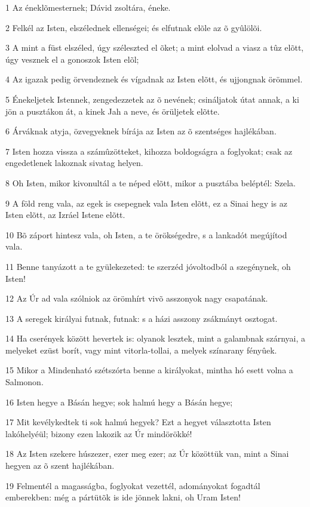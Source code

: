 \par 1 Az éneklõmesternek; Dávid zsoltára, éneke.
\par 2 Felkél az Isten, elszélednek ellenségei; és elfutnak elõle az õ gyûlölõi.
\par 3 A mint a füst elszéled, úgy széleszted el õket; a mint elolvad a viasz a tûz elõtt, úgy vesznek el a gonoszok Isten elõl;
\par 4 Az igazak pedig örvendeznek és vígadnak az Isten elõtt, és ujjongnak örömmel.
\par 5 Énekeljetek Istennek, zengedezzetek az õ nevének; csináljatok útat annak, a ki jön a pusztákon át, a kinek Jah a neve, és örüljetek elõtte.
\par 6 Árváknak atyja, özvegyeknek bírája az Isten az õ szentséges hajlékában.
\par 7 Isten hozza vissza a számûzötteket, kihozza boldogságra a foglyokat; csak az engedetlenek lakoznak sivatag helyen.
\par 8 Oh Isten, mikor kivonultál a te néped elõtt, mikor a pusztába beléptél: Szela.
\par 9 A föld reng vala, az egek is csepegnek vala Isten elõtt, ez a Sinai hegy is az Isten elõtt, az Izráel Istene elõtt.
\par 10 Bõ záport hintesz vala, oh Isten, a te örökségedre, s a lankadót megújítod vala.
\par 11 Benne tanyázott a te gyülekezeted: te szerzéd jóvoltodból a szegénynek, oh Isten!
\par 12 Az Úr ad vala szólniok az örömhírt vivõ asszonyok nagy csapatának.
\par 13 A seregek királyai futnak, futnak: s a házi asszony zsákmányt osztogat.
\par 14 Ha cserények között hevertek is: olyanok lesztek, mint a galambnak szárnyai, a melyeket ezüst borít, vagy mint vitorla-tollai, a melyek színarany fényûek.
\par 15 Mikor a Mindenható szétszórta benne a királyokat, mintha hó esett volna a Salmonon.
\par 16 Isten hegye a Básán hegye; sok halmú hegy a Básán hegye;
\par 17 Mit kevélykedtek ti sok halmú hegyek? Ezt a hegyet választotta Isten lakóhelyéül; bizony ezen lakozik az Úr mindörökké!
\par 18 Az Isten szekere húszezer, ezer meg ezer; az Úr közöttük van, mint a Sinai hegyen az õ szent hajlékában.
\par 19 Felmentél a magasságba, foglyokat vezettél, adományokat fogadtál emberekben: még a pártütõk is ide jönnek lakni, oh Uram Isten!
